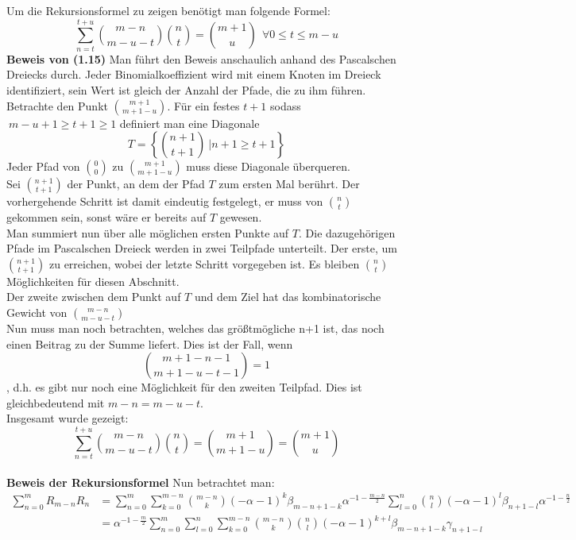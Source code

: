 \documentclass[a4paper, 11pt]{scrreprt}
\begin{document}
Um die Rekursionsformel zu zeigen benötigt man folgende Formel:
\begin{equation}
	\sum_{n= t}^{t+u} \binom{m-n}{m-u-t} \binom{n}{t} = \binom{m+1}{u}~~\forall 0\leq t \leq m-u
\end{equation}
\textbf{Beweis von (1.15)}  
Man führt den Beweis anschaulich anhand des Pascalschen Dreiecks durch. Jeder Binomialkoeffizient wird mit einem Knoten im Dreieck identifiziert, sein Wert ist gleich der Anzahl der Pfade, die zu ihm führen. \\
Betrachte den Punkt $ \binom{m+1}{m+1-u} $. Für ein festes $t+1$ sodass $~m-u+1\geq t+1 \geq 1$ definiert man  eine Diagonale \[T=\left\lbrace  \binom{n+1}{t+1}~\vert n+1 \geq t+1 \right\rbrace  \] Jeder Pfad von $ \binom{0}{0} $ zu $ \binom{m+1}{m+1-u} $ muss diese Diagonale überqueren. \\Sei $ \binom{n+1}{t+1} $ der Punkt, an dem der Pfad $ T $ zum ersten Mal berührt. Der vorhergehende Schritt ist damit eindeutig festgelegt, er muss von $ \binom{n}{t} $ gekommen sein, sonst wäre er bereits auf $ T $ gewesen.\\ 
Man summiert nun über alle möglichen ersten Punkte auf $ T $. Die dazugehörigen Pfade im Pascalschen Dreieck werden in zwei Teilpfade unterteilt. Der erste, um $ \binom{n+1}{t+1} $ zu erreichen, wobei der letzte Schritt vorgegeben ist. Es bleiben $ \binom{n}{t} $ Möglichkeiten für diesen Abschnitt.\\
Der zweite zwischen dem Punkt auf $ T $ und dem Ziel hat das kombinatorische Gewicht von $\binom{m-n}{m-u-t}$\\
Nun muss man noch betrachten, welches das größtmögliche n+1 ist, das noch einen Beitrag zu der Summe liefert. Dies ist der Fall, wenn \[ \binom{m+1-n-1}{m+1-u-t-1}=1  \], d.h. es gibt nur noch eine Möglichkeit für den zweiten Teilpfad. Dies ist gleichbedeutend mit $ m-n=m-u-t $.\\Insgesamt wurde gezeigt:
\[ \sum_{n=t}^{t+u}\binom{m-n}{m-u-t} \binom{n}{t}= \binom{m+1}{m+1-u}=\binom{m+1}{u} \]\\


\textbf{Beweis der Rekursionsformel}
Nun betrachtet man:
\begin{align*}
\sum_{n=0}^m R_{m-n} R_n 
&= \sum_{n=0}^m \sum_{k=0}^{m-n} \binom{m-n}{k} (-\alpha -1)^k \beta_{m-n+1-k} \alpha^{-1-\frac{m-n}{2}} \sum_{l=0}^n \binom{n}{l} (-\alpha -1)^l \beta_{n+1-l} \alpha^{-1-\frac{n}{2}} \\
&= \alpha^{-1-\frac{m}{2}} \sum_{n=0}^m \sum_{l=0}^n \sum_{k=0}^{m-n} \binom{m-n}{k}  \binom{n}{l} (-\alpha -1)^{k+l} \beta_{m-n+1-k} \gamma_{n+1-l}	
\end{align*}
\end{document}
